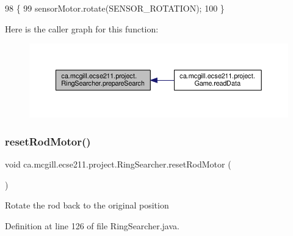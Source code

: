 \begin{DoxyCode}
98                               \{
99     sensorMotor.rotate(SENSOR\_ROTATION);
100   \}
\end{DoxyCode}
Here is the caller graph for this function\+:
\nopagebreak
\begin{figure}[H]
\begin{center}
\leavevmode
\includegraphics[width=350pt]{classca_1_1mcgill_1_1ecse211_1_1project_1_1_ring_searcher_abf31c36cadb144a4651b11f7fa37120a_icgraph}
\end{center}
\end{figure}
\mbox{\label{classca_1_1mcgill_1_1ecse211_1_1project_1_1_ring_searcher_a8b0ea0bf4cd07b6c8a090c3e9bc8eb04}} 
\subsubsection{\texorpdfstring{reset\+Rod\+Motor()}{resetRodMotor()}}
{\footnotesize\ttfamily void ca.\+mcgill.\+ecse211.\+project.\+Ring\+Searcher.\+reset\+Rod\+Motor (\begin{DoxyParamCaption}{ }\end{DoxyParamCaption})}

Rotate the rod back to the original position 

Definition at line 126 of file Ring\+Searcher.\+java.


